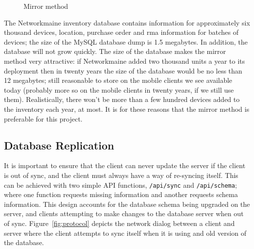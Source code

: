 \begin{figure}[h!]
\centering
{}
\caption{Mirror method}
\label{fig:mirror}
\end{figure}

The Networkmaine inventory database contains information for approximately six
thousand devices, location, purchase order and rma information for batches of
devices; the size of the MySQL database dump is 1.5 megabytes. In addition, the
database will not grow quickly. The size of the database makes the mirror method
very attractive: if Networkmaine added two thousand units a year to its
deployment then in twenty years the size of the database would be no less than
12 megabytes; still reasonable to store on the mobile clients we see available
today (probably more so on the mobile clients in twenty years, if we still use
them). Realistically, there won't be more than a few hundred devices added to
the inventory each year, at most. It is for these reasons that the mirror method
is preferable for this project. 





\subsection{Database Replication} \label{sec:db}


It is important to ensure that the client can never update the server if the
client is out of sync, and the client must always have a way of re-syncing
itself.  This can be achieved with two simple API functions, \texttt{/api/sync}
and \texttt{/api/schema}; where one function requests missing information and
another requests schema information. This design accounts for the database
schema being upgraded on the server, and clients attempting to make changes to
the database server when out of sync. Figure~\ref{fig:protocol} depicts the
network dialog between a client and server where the client attempts to sync
itself when it is using and old version of the database. 




